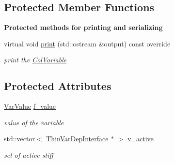 \subsection*{Protected Member Functions}
\begin{Indent}\textbf{ Protected methods for printing and serializing}\par
\begin{DoxyCompactItemize}
\item 
\mbox{\label{class_s_m_spp__di__unipi__it_1_1_col_variable_a59a9fcbf8f9f86d348344b2073644b0e}} 
virtual void \mbox{\hyperlink{class_s_m_spp__di__unipi__it_1_1_col_variable_a59a9fcbf8f9f86d348344b2073644b0e}{print}} (std\+::ostream \&output) const override
\begin{DoxyCompactList}\small\item\em print the \mbox{\hyperlink{class_s_m_spp__di__unipi__it_1_1_col_variable}{Col\+Variable}} \end{DoxyCompactList}\end{DoxyCompactItemize}
\end{Indent}
\subsection*{Protected Attributes}
\begin{DoxyCompactItemize}
\item 
\mbox{\label{class_s_m_spp__di__unipi__it_1_1_col_variable_a9597e88103117c4647b08689352712cc}} 
\mbox{\hyperlink{class_s_m_spp__di__unipi__it_1_1_col_variable_a5f7c601f4a24317327fbd91b9c7cd951}{Var\+Value}} \mbox{\hyperlink{class_s_m_spp__di__unipi__it_1_1_col_variable_a9597e88103117c4647b08689352712cc}{f\+\_\+value}}
\begin{DoxyCompactList}\small\item\em value of the variable \end{DoxyCompactList}\item 
\mbox{\label{class_s_m_spp__di__unipi__it_1_1_col_variable_ac964547296e6c26aaf01fef3e9e3afa1}} 
std\+::vector$<$ \mbox{\hyperlink{class_s_m_spp__di__unipi__it_1_1_thin_var_dep_interface}{Thin\+Var\+Dep\+Interface}} $\ast$ $>$ \mbox{\hyperlink{class_s_m_spp__di__unipi__it_1_1_col_variable_ac964547296e6c26aaf01fef3e9e3afa1}{v\+\_\+active}}
\begin{DoxyCompactList}\small\item\em set of active stiff \end{DoxyCompactList}\end{DoxyCompactItemize}


